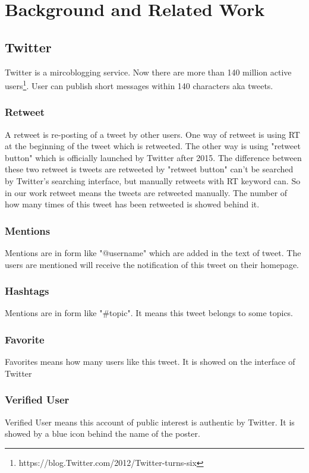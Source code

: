 \chapter{Background and Related Work} %
\label{cha:Related_Work}
\section{Twitter}
Twitter is a mircoblogging service. Now there are more than 140 million active users\footnote{https://blog.Twitter.com/2012/Twitter-turns-six}. User can publish short messages within 140 characters aka tweets.
\subsection{Retweet}
A retweet is re-posting of a tweet by other users. One way of retweet is using RT at the beginning of the tweet which is retweeted. The other way is using "retweet button" which is officially launched by Twitter after 2015. The difference between these two retweet is tweets are retweeted by "retweet button" can't be searched by Twitter's searching interface, but manually retweets with RT keyword can. So in our work retweet means the tweets are retweeted manually. The number of how many times of this tweet has been retweeted is showed behind it.

\subsection{Mentions}
Mentions are in form like "@username" which are added in the text of tweet. The users are mentioned will receive the notification of this tweet on their homepage.
\subsection{Hashtags}
Mentions are in form like "\#topic". It means this tweet belongs to some topics.

\subsection{Favorite}
Favorites means how many users like this tweet. It is showed on the interface of Twitter
\subsection{Verified User}
Verified User means this account of public interest is authentic by Twitter. It is showed by a blue icon behind the name of the poster.
